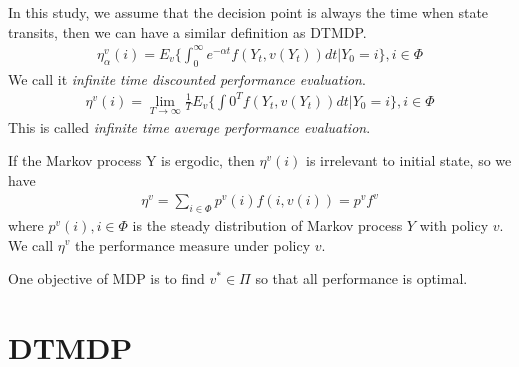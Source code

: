 \documentclass[runningheads]{llncs}
\begin{document}
    \par
    In this study, we assume that the decision point is always the time when state transits,
    then we can have a similar definition as DTMDP.
    \begin{align}
        \eta_\alpha^v(i) = E_v \{ \int_{0}^\infty e^{-\alpha t} f(Y_t, v(Y_t)) dt | Y_0 = i \}, i \in \Phi
    \end{align}
    We call it \emph{infinite time
    discounted performance evaluation}.
    \begin{align}
        \eta^v(i) = \mathop{\lim}_{T\rightarrow\infty} \frac{1}{T} E_v \{ \int{0}^{T} f(Y_t, v(Y_t)) dt | Y_0 = i \}, i \in \Phi
    \end{align}
    This is called \emph{infinite time average performance evaluation}.
    \par
    If the Markov process Y is ergodic, then $\eta^v(i)$ is irrelevant to
    initial state, so we have
    \begin{align}
        \eta^v = \sum_{i \in \Phi} p^v (i) f(i, v(i)) = p^v f^v
    \end{align}
    where $p^v(i), i \in \Phi$ is the steady distribution of Markov process $Y$
    with policy $v$. We call $\eta^v$
    the performance measure under policy $v$.
    \par
    One objective of MDP is to find $v^* \in \Pi$ so that all performance is optimal.

    \section{DTMDP}
\end{document}
